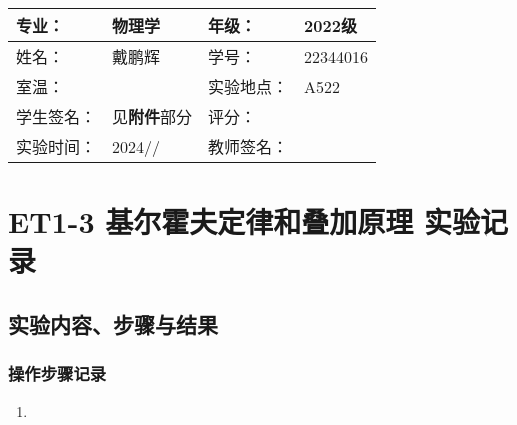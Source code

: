 \documentclass[dvipsnames, svgnames,a4paper,11pt]{article}
\begin{document}
	
		
	
		
	
	
	
	
	\clearpage
	
	\begin{table}
		\renewcommand\arraystretch{1.7}
		\centering
		\begin{tabularx}{\textwidth}{|X|X|X|X|}
			\hline
			专业： & 物理学 & 年级： & 2022级 \\
			\hline
			姓名： & 戴鹏辉 & 学号： & 22344016\\
			\hline
			室温： &  & 实验地点： & A522 \\
			\hline
			学生签名：& 见\textbf{附件}部分 & 评分： &\\
			\hline
			实验时间：& 2024// & 教师签名：&\\
			\hline
		\end{tabularx}
	\end{table}
	
	\section{ET1-3 基尔霍夫定律和叠加原理  \quad\heiti 实验记录}
	
	\subsection{实验内容、步骤与结果}
	
	\subsubsection{操作步骤记录}
	\begin{enumerate}
		\item 
	\end{enumerate}	
	
\end{document}
